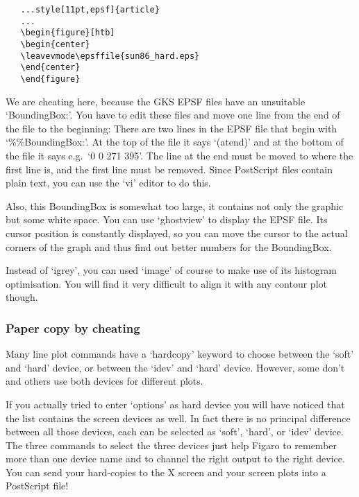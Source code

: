 \begin{verbatim}
   ...style[11pt,epsf]{article}
   ...
   \begin{figure}[htb]
   \begin{center}
   \leavevmode\epsffile{sun86_hard.eps}
   \end{center}
   \end{figure}
\end{verbatim}

   We are cheating here, because the GKS EPSF files have an unsuitable
   `BoundingBox:'. You have to edit these files and move one line
   from the end of the file to the beginning: There are two lines in the
   EPSF file that begin with `\%\%BoundingBox:'. At the top of the file
   it says `(atend)' and at the bottom of the file it says e.g.\ `0 0 271
   395'. The line at the end must be moved to where the first line is,
   and the first line must be removed. Since PostScript files contain
   plain text, you can use the `vi' editor to do this.

   Also, this BoundingBox is somewhat too large, it contains not only
   the graphic but some white space. You can use `ghostview' to display
   the EPSF file. Its cursor position is constantly displayed, so you
   can move the cursor to the actual corners of the graph and thus find
   out better numbers for the BoundingBox.

   Instead of `igrey', you can used `image' of course to make use of its
   histogram optimisation. You will find it very difficult to align it
   with any contour plot though.


\subsubsection{Paper copy by cheating}

   Many line plot commands have a `hardcopy' keyword to choose between
   the `soft' and `hard' device, or between the `idev' and `hard'
   device. However, some don't and others use both devices for different
   plots.

   If you actually tried to enter `options' as hard device you will have
   noticed that the list contains the screen devices as well. In fact
   there is no principal difference between all those devices, each can
   be selected as `soft', `hard', or `idev' device. The three commands
   to select the three devices just help Figaro to remember more than
   one device name and to channel the right output to the right device.
   You can send your hard-copies to the X screen and your screen plots
   into a PostScript file!

